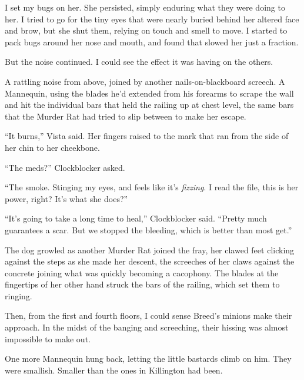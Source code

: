 I set my bugs on her.  She persisted, simply enduring what they were doing to her.  I tried to go for the tiny eyes that were nearly buried behind her altered face and brow, but she shut them, relying on touch and smell to move.  I started to pack bugs around her nose and mouth, and found that slowed her just a fraction.



But the noise continued.  I could see the effect it was having on the others.



A rattling noise from above, joined by another nails-on-blackboard screech.  A Mannequin, using the blades he'd extended from his forearms to scrape the wall and hit the individual bars that held the railing up at chest level, the same bars that the Murder Rat had tried to slip between to make her escape.



``It burns,'' Vista said.  Her fingers raised to the mark that ran from the side of her chin to her cheekbone.



``The meds?'' Clockblocker asked.



``The smoke.  Stinging my eyes, and feels like it's \emph{fizzing}.  I read the file, this is her power, right?  It's what she does?''



``It's going to take a long time to heal,'' Clockblocker said.  ``Pretty much guarantees a scar.  But we stopped the bleeding, which is better than most get.''



The dog growled as another Murder Rat joined the fray, her clawed feet clicking against the steps as she made her descent, the screeches of her claws against the concrete joining what was quickly becoming a cacophony.  The blades at the fingertips of her other hand struck the bars of the railing, which set them to ringing.



Then, from the first and fourth floors, I could sense Breed's minions make their approach.  In the midst of the banging and screeching, their hissing was almost impossible to make out.



One more Mannequin hung back, letting the little bastards climb on him.  They were smallish.  Smaller than the ones in Killington had been.



